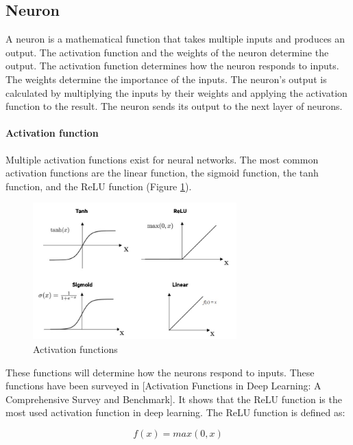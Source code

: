 \subsection{Neuron}

A neuron is a mathematical function that takes multiple inputs and produces an output. The activation function and the weights of the neuron determine the output. The activation function determines how the neuron responds to inputs. The weights determine the importance of the inputs. The neuron's output is calculated by multiplying the inputs by their weights and applying the activation function to the result. The neuron sends its output to the next layer of neurons.

\paragraph{Activation function}

Multiple activation functions exist for neural networks. The most common activation functions are the linear function, the sigmoid function, the tanh function, and the ReLU function (Figure \ref{fig:activation_functions}).

\begin{figure}[H]
    \centering
    \includegraphics[width=0.7\textwidth]{../Images/activation_functions.png}
    \caption{Activation functions}
    \label{fig:activation_functions}
\end{figure}

These functions will determine how the neurons respond to inputs. These functions have been surveyed in [Activation Functions in Deep Learning: A Comprehensive Survey and Benchmark]\cite{dubey2022activation}. It shows that the ReLU function is the most used activation function in deep learning. The ReLU function is defined as:

\begin{equation}
    f(x) = max(0, x)
\end{equation}

